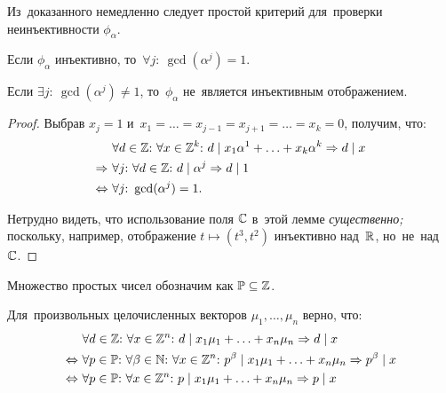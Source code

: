 \documentclass{article}
\begin{document}
Из~доказанного немедленно следует простой критерий для~проверки неинъективности $\phi_\alpha$.

\begin{lemma*}
    Если $\phi_\alpha$ инъективно, то~$\forall j{:}\ \gcd(\alpha^j) = 1$.
\end{lemma*}

\begin{consequence*}
    Если $\exists j{:}\ \gcd(\alpha^j) \neq 1$, то~$\phi_\alpha$ не~является инъективным отображением.
\end{consequence*}

\begin{proof}
    Выбрав $x_j = 1$ и~$x_1 = \ldots = x_{j - 1} = x_{j + 1} = \ldots = x_k = 0$, получим, что:
    \begin{align*}
                         & \forall d \in \mathbb{Z}{:}\ \forall x \in \mathbb{Z}^k{:}\ d \mid x_1 \alpha^1 + \ldots + x_k \alpha^k \Rightarrow d \mid x \\
            \Rightarrow\ & \forall j{:}\ \forall d \in \mathbb{Z}{:}\ d \mid \alpha^j \Rightarrow d \mid 1 \\
        \Leftrightarrow\ & \forall j{:}\ \gcd(\alpha^j) = 1.
    \end{align*}

    Нетрудно видеть, что использование поля $\mathbb{C}$ в~этой лемме \textit{существенно;} поскольку, например,
    отображение $t \mapsto (t^3, t^2)$ инъективно над~$\mathbb{R}$, но~не~над~$\mathbb{C}$.
\end{proof}

Множество простых чисел обозначим как $\mathbb{P} \subseteq \mathbb{Z}$.

\begin{lemma*}
    Для~произвольных целочисленных векторов $\mu_1, \ldots, \mu_n$ верно, что:
    \begin{align*}
                         & \forall d \in \mathbb{Z}{:}\ \forall x \in \mathbb{Z}^n{:}\ d \mid x_1 \mu_1 + \ldots + x_n \mu_n \Rightarrow d \mid x \\
        \Leftrightarrow\ & \forall p \in \mathbb{P}{:}\ \forall \beta \in \mathbb{N}{:}\ \forall x \in \mathbb{Z}^n{:}\ p^\beta \mid x_1 \mu_1 + \ldots + x_n \mu_n \Rightarrow p^\beta \mid x \\
        \Leftrightarrow\ & \forall p \in \mathbb{P}{:}\ \forall x \in \mathbb{Z}^n{:}\ p \mid x_1 \mu_1 + \ldots + x_n \mu_n \Rightarrow p \mid x
    \end{align*}
\end{lemma*}
\end{document}
